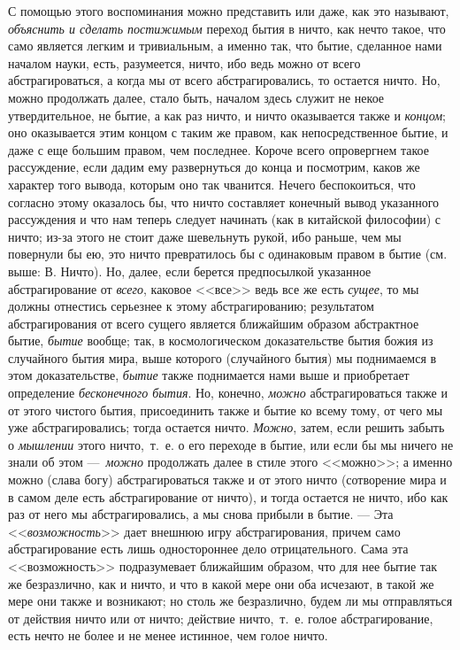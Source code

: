 С помощью этого воспоминания можно представить или даже, как это называют,
{\em объяснить и сделать постижимым} переход бытия в
ничто, как нечто такое, что само является легким и тривиальным, а именно
так, что бытие, сделанное нами началом науки, есть, разумеется, ничто, ибо
ведь можно от всего абстрагироваться, а когда мы от всего абстрагировались,
то остается ничто. Но, можно продолжать далее, стало быть, началом здесь
служит не некое утвердительное, не бытие, а как раз ничто, и ничто
оказывается также и {\em концом}; оно оказывается этим
концом с таким же правом, как непосредственное бытие, и даже с еще большим
правом, чем последнее. Короче всего опровергнем такое рассуждение, если
дадим ему развернуться до конца и посмотрим, каков же характер того вывода,
которым оно так чванится. Нечего беспокоиться, что согласно этому оказалось
бы, что ничто составляет конечный вывод указанного рассуждения и что нам
теперь следует начинать (как в китайской философии) с ничто; из-за этого не
стоит даже шевельнуть рукой, ибо раньше, чем мы повернули бы ею, это ничто
превратилось бы с одинаковым правом в бытие (см. выше: В. Ничто). Но,
далее, если берется предпосылкой указанное абстрагирование от
{\em всего}, каковое <<все>> ведь все же есть
{\em сущее}, то мы должны отнестись серьезнее к этому
абстрагированию; результатом абстрагирования от всего сущего является
ближайшим образом абстрактное бытие, {\em бытие}
вообще; так, в космологическом доказательстве бытия божия из случайного
бытия мира, выше которого (случайного бытия) мы поднимаемся в этом
доказательстве, {\em бытие} также поднимается нами выше
и приобретает определение {\em бесконечного бытия}. Но,
конечно, {\em можно} абстрагироваться также и от этого
чистого бытия, присоединить также и бытие ко всему тому, от чего мы уже
абстрагировались; тогда остается ничто. {\em Можно},
затем, если решить забыть о {\em мышлении} этого
ничто,~т.~е. о его переходе в бытие, или если бы мы ничего не знали об этом
---~{\em можно} продолжать далее в стиле этого <<можно>>; а
именно можно (слава богу) абстрагироваться также и от этого ничто
(сотворение мира и в самом деле есть абстрагирование от ничто), и тогда
остается не ничто, ибо как раз от него мы абстрагировались, а мы снова
прибыли в бытие. --- Эта <<{\em возможность}>> дает внешнюю
игру абстрагирования, причем само абстрагирование есть лишь одностороннее
дело отрицательного. Сама эта <<возможность>> подразумевает ближайшим
образом, что для нее бытие так же безразлично, как и ничто, и что в какой
мере они оба исчезают, в такой же мере они также и возникают; но столь же
безразлично, будем ли мы отправляться от действия ничто или от ничто;
действие ничто,~т.~е. голое абстрагирование, есть нечто не более и не менее
истинное, чем голое ничто.

